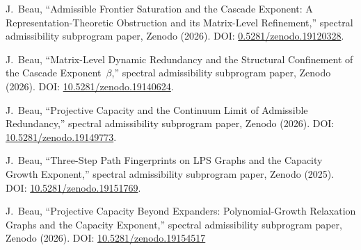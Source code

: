 J.~Beau,
``Admissible Frontier Saturation and the Cascade Exponent: A Representation-Theoretic Obstruction and its Matrix-Level
Refinement,''
spectral admissibility subprogram paper, Zenodo (2026).
DOI: \href{https://doi.org/10.5281/zenodo.19120328}{0.5281/zenodo.19120328}.

J.~Beau,
``Matrix-Level Dynamic Redundancy and the Structural Confinement of the Cascade Exponent~$\beta$,''
spectral admissibility subprogram paper, Zenodo (2026).
DOI: \href{https://doi.org/10.5281/zenodo.19140624}{10.5281/zenodo.19140624}.

J.~Beau,
``Projective Capacity and the Continuum Limit of Admissible Redundancy,''
spectral admissibility subprogram paper, Zenodo (2026).
DOI: \href{https://doi.org/10.5281/zenodo.19149773}{10.5281/zenodo.19149773}.

J.~Beau,
``Three-Step Path Fingerprints on LPS Graphs and the Capacity Growth Exponent,''
spectral admissibility subprogram paper, Zenodo (2025).
DOI: \href{https://doi.org/10.5281/zenodo.19151769}{10.5281/zenodo.19151769}.

J.~Beau,
``Projective Capacity Beyond Expanders: Polynomial-Growth Relaxation Graphs and the Capacity Exponent,''
spectral admissibility subprogram paper, Zenodo (2026).
DOI: \href{https://doi.org/10.5281/zenodo.19154517}{10.5281/zenodo.19154517}
